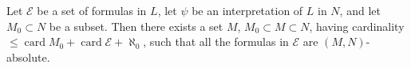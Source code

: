 Let $\mathcal{E}$ be a set of formulas in $L$, let $\psi$ be an interpretation of $L$ in $N$, and let $M_0 \subset N$ be a subset. Then there exists a set $M$, $M_0 \subset M \subset N$, having cardinality $\leqslant \operatorname{card} M_0 + \operatorname{card} \mathcal{E} + \aleph_0$, such that all the formulas in $\mathcal{E}$ are $(M,N)$-absolute.

